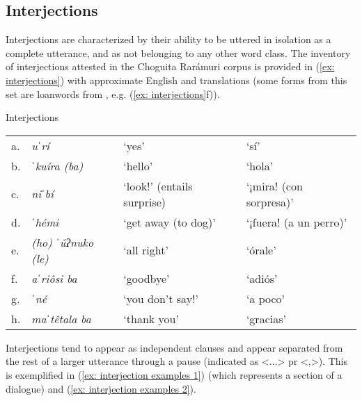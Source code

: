 \subsection{Interjections}
\label{subsec: interjections}

Interjections are characterized by their ability to be uttered in isolation as a complete utterance, and as not belonging to any other word class. The inventory of interjections attested in the Choguita Rarámuri corpus is provided in (\ref{ex: interjections}) with approximate English and  translations (some forms from this set are loanwords from , e.g. (\ref{ex: interjections}f)).

\ea\label{ex: interjections}
{Interjections}
\setlength{\tabcolsep}{3pt}
\begin{tabular}{llll}
    a. & {\textit{uˈrí}}&{`yes'}&`sí'\\
    b. & {\textit{ˈkuíra (ba)}}&{`hello'}&`hola'\\
    c. & {\textit{niˈbí}}&{`look!' (entails surprise)}&`¡mira! (con sorpresa)'\\
    d. & {\textit{ˈhémi}}&{`get away (to dog)'}& `¡fuera! (a un perro)'\\
    e. & {\textit{(ho) ˈúʔnuko (le)}}&{`all right'}& {`órale'}\\
    f. & {\textit{aˈriôsi ba}}&{`goodbye'}& {`adiós'}\\
    g. & {\textit{ˈné}}&{`you don't say!'}& {`a poco'}\\
    h. & {\textit{maˈtêtala ba}}&{`thank you'}&{`gracias'}\\
\end{tabular}
    \z

Interjections tend to appear as independent clauses and appear separated from the rest of a larger utterance through a pause (indicated as <...> pr <,>). This is exemplified in (\ref{ex: interjection examples 1}) (which represents a section of a dialogue) and (\ref{ex: interjection examples 2}).

\ea\label{ex: interjection examples 1}

